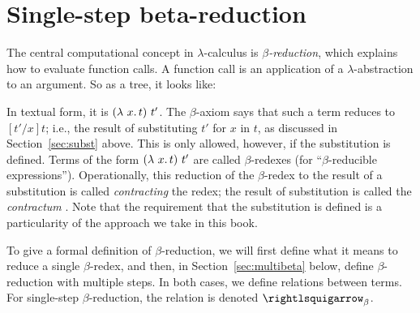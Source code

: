 \section{Single-step beta-reduction}
\label{sec:singlebeta}

The central computational concept in $\lambda$-calculus is
\emph{$\beta$-reduction}, which explains how to evaluate function
calls.  A function call is an application of a $\lambda$-abstraction
to an argument.  So as a tree, it looks like:
\begin{center}
\end{center}
\noindent In textual form, it is $(\lam{x}{t})\ t'$.  The
$\beta$-axiom says that such a term reduces to $[t'/x]t$; i.e., the
result of substituting $t'$ for $x$ in
$t$, as discussed in Section~\ref{sec:subst} above.  This is only
allowed, however, if the substitution is defined.  Terms of the
form $(\lam{x}{t})\ t'$ are called
$\beta$-redexes (for ``$\beta$-reducible
expressions'').  Operationally, this
reduction of the $\beta$-redex to the result of a substitution is
called \emph{contracting} the redex; the result of substitution is called
the \emph{contractum}
.    Note that the requirement that
the substitution is defined is a particularity of the approach we take
in this book.

To give a formal definition of $\beta$-reduction, we will first define
what it means to reduce a single $\beta$-redex, and then, in
Section~\ref{sec:multibeta} below, define $\beta$-reduction with
multiple steps.  In both cases, we define relations between terms.  For
single-step $\beta$-reduction, the relation is denoted $\betar$.

